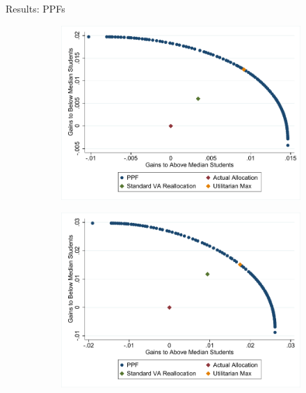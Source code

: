 \documentclass[t,aspectratio=169]{beamer}
\begin{document}
\begin{frame}{Results: PPFs}
\begin{figure}[H]
    \centering
    
    \begin{subfigure}[b]{0.45\textwidth}
        \includegraphics[width=1\textwidth]{Working_Paper/WP_Figures/WithinSchoolReallocationELA.pdf}
    \end{subfigure}
    \begin{subfigure}[b]{0.45\textwidth}
        \includegraphics[width=1\textwidth]{Working_Paper/WP_Figures/WithinSchoolReallocationMath.pdf}
    \end{subfigure}
\end{figure}

\end{frame}
\end{document}
